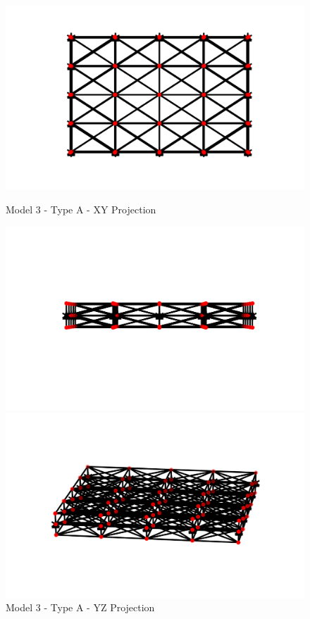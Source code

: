 \begin{figure}[!htbp]
\begin{minipage}{0.3\textwidth}
    \centering
    \includegraphics[width = 1\textwidth]{Figures/M3_type_a_XY.png}
    \caption{Model 3 - Type A - XY Projection}
    \label{fig:M3_a_XY}
\end{minipage}
\hspace{5mm}
\begin{minipage}{0.3\textwidth}
    \centering
    \includegraphics[width = 1\textwidth]{Figures/M3_type_a_YZ.png}
    \caption{Model 3 - Type A - YZ Projection}
    \label{fig:M3_a_YZ}
\end{minipage}
\hspace{5mm}
\begin{minipage}{0.3\textwidth}
    \centering
    \includegraphics[width = 1\textwidth]{Figures/M3_type_a_3D.png}

\end{minipage}
\end{figure}
